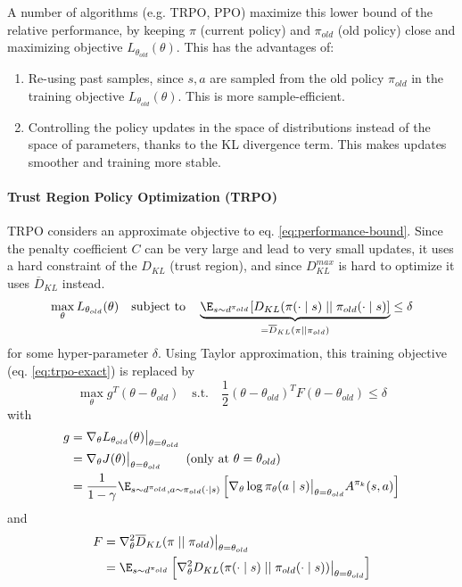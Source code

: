 A number of algorithms (e.g. TRPO, PPO) maximize this lower bound of the relative performance, by keeping $\pi$ (current policy) and $\pi_{old}$ (old policy) close and maximizing objective $L_{\theta_{old}}(\theta)$. This has the advantages of:
\begin{enumerate}
    \item Re-using past samples, since $s,a$ are sampled from the old policy $\pi_{old}$ in the training objective $L_{\theta_{old}}(\theta)$. This is more sample-efficient.
    \item Controlling the policy updates in the space of distributions instead of the space of parameters, thanks to the KL divergence term. This makes updates smoother and training more stable.
\end{enumerate}

\paragraph{Trust Region Policy Optimization (TRPO) \cite{schulman2015trust}}
TRPO considers an approximate objective to eq. \ref{eq:performance-bound}. Since the penalty coefficient $C$ can be very large and lead to very small updates, it uses a hard constraint of the $D_{KL}$ (trust region), and since $D_{KL}^{max}$ is hard to optimize it uses $\overline{D}_{KL}$ instead.
\begin{equation}
    \max_\theta L_{\theta_{old}}(\theta) 
    \quad \text{subject to} \quad
    \underbrace{
        \E_{s \sim d^{\pi_{old}}}[D_{KL}(\pi(\cdot\mid s) \mid \mid  \pi_{old}(\cdot\mid s)]
    }_{=\overline{D}_{KL}(\pi\mid \mid \pi_{old})}
    \leq \delta    
\label{eq:trpo-exact}
\end{equation}
for some hyper-parameter $\delta$.
Using Taylor approximation, this training objective (eq. \ref{eq:trpo-exact}) is replaced by
\begin{equation}
    \max_\theta g^T (\theta - \theta_{old})
    \quad \text{s.t.} \quad
    \frac{1}{2}(\theta-\theta_{old})^T F (\theta-\theta_{old}) \leq \delta
\label{eq:trpo-taylor-approx}
\end{equation}
with
\begin{align*}
g 
    &= \nabla_\theta L_{\theta_{old}}(\theta)\big|_{\theta=\theta_{old}} \\
    &= \nabla_\theta J(\theta)\big|_{\theta=\theta_{old}} 
    \qquad \text{(only at $\theta=\theta_{old}$)} \\
    &= \frac{1}{1-\gamma} 
    \E_{s\sim d^{\pi_{old}}, a \sim \pi_{old}(\cdot\mid s)}\left[
        \nabla_\theta \log \pi_\theta(a\mid s)\big|_{\theta=\theta_{old}} A^{\pi_k}(s,a)
    \right]
\end{align*}
and
\begin{align*}
F 
    &= \nabla^2_\theta \overline{D}_{KL}(\pi\mid \mid \pi_{old})\big|_{\theta=\theta_{old}} \\
    &= \E_{s\sim d^{\pi_{old}}}\left[
        \nabla^2_\theta D_{KL}(\pi(\cdot\mid s)\mid \mid \pi_{old}(\cdot\mid s))\big|_{\theta=\theta_{old}}
    \right]
\end{align*}

